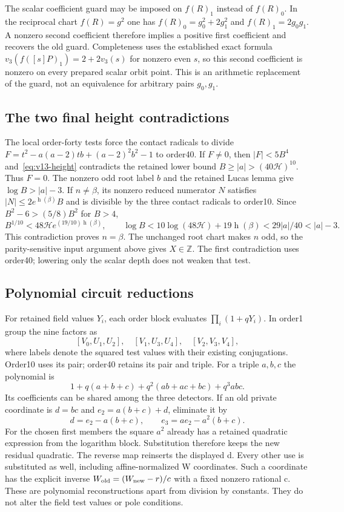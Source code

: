 The scalar coefficient guard may be imposed on $f(R)_1$ instead of
$f(R)_0$. In the reciprocal chart $f(R)=g^2$ one has
$f(R)_0=g_0^2+2g_1^2$ and $f(R)_1=2g_0g_1$. A nonzero second
coefficient therefore implies a positive first coefficient and recovers
the old guard. Completeness uses the established exact formula
$v_3(f([s]P)_1)=2+2v_3(s)$ for nonzero even $s$, so this second
coefficient is nonzero on every prepared scalar orbit point.
This is an arithmetic replacement of the guard, not an equivalence
for arbitrary pairs $g_0,g_1$.

\subsection{The two final height contradictions}
The local order-forty tests force the contact radicals to divide
$F=t^2-a(a-2)tb+(a-2)^2b^2-1$ to order40.
If $F\ne0$, then $|F|<5B^4$ and~\eqref{eq:v13-height} contradicts
the retained lower bound $B\ge|a|>(40\mathcal H)^{10}$.
Thus $F=0$. The nonzero odd root label $b$ and the retained Lucas lemma
give $\log B>|a|-3$.
If $n\ne\beta$, its nonzero reduced numerator $N$ satisfies
$|N|\le2e^{\operatorname h(\beta)}B$ and is divisible by the three
contact radicals to order10. Since $B^2-6>(5/8)B^2$ for $B>4$,
\[
 B^{1/10}<48\mathcal H e^{(19/10)\operatorname h(\beta)},\qquad
 \log B<10\log(48\mathcal H)+19\operatorname h(\beta)
          <29|a|/40<|a|-3.
\]
This contradiction proves $n=\beta$. The unchanged root chart makes $n$ odd, so the parity-sensitive input argument above gives $X\in\mathbb Z$.
The first contradiction uses order40; lowering only the scalar depth
does not weaken that test.

\subsection{Polynomial circuit reductions}
For retained field values $Y_i$, each order block evaluates
$\prod_i(1+qY_i)$. In order1 group the nine factors as
\[
 [V_0,U_1,U_2],\quad[V_1,U_3,U_4],\quad[V_2,V_3,V_4],
\]
where labels denote the squared test values with their existing
conjugations. Order10 uses its pair; order40 retains its pair and
triple. For a triple $a,b,c$ the polynomial is
\[
 1+q(a+b+c)+q^2(ab+ac+bc)+q^3abc.
\]
Its coefficients can be shared among the three detectors. If an old
private coordinate is $d=bc$ and $e_2=a(b+c)+d$, eliminate it by
\[
 d=e_2-a(b+c),\qquad e_3=ae_2-a^2(b+c).
\]
For the chosen first members the square $a^2$ already has a retained
quadratic expression from the logarithm block. Substitution therefore
keeps the new residual quadratic. The reverse map reinserts the displayed
d. Every other use is substituted as well, including affine-normalized
W coordinates. Such a coordinate has the explicit inverse
$W_{\rm old}=(W_{\rm new}-r)/c$ with a fixed nonzero rational c.
These are polynomial reconstructions apart from division by constants.
They do not alter the field test values or pole conditions.

